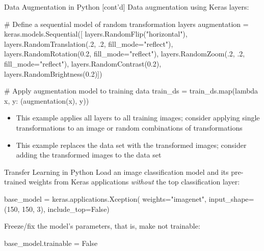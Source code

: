 \documentclass[ignorenonframetext,xcolor=x11names]{beamer}
\begin{document}
\begin{frame}[fragile]{Data Augmentation in Python \small [cont'd]}
Data augmentation using Keras layers:
\begin{pythoncode}
# Define a sequential model of random transformation layers
augmentation = keras.models.Sequential([
    layers.RandomFlip("horizontal"),
    layers.RandomTranslation(.2, .2, fill_mode="reflect"),
    layers.RandomRotation(0.2, fill_mode="reflect"),
    layers.RandomZoom(.2, .2, fill_mode="reflect"),
    layers.RandomContrast(0.2),
    layers.RandomBrightness(0.2)])

# Apply augmentation model to training data
train_ds = train_ds.map(lambda x, y: (augmentation(x), y))
\end{pythoncode}

\begin{block}{}
\small
\begin{itemize}
   \item This example applies all layers to all training images; consider applying single transformations to an image or random combinations of transformations
   \item This example replaces the data set with the transformed images; consider adding the transformed images to the data set
\end{itemize}
\end{block}
\end{frame}

\begin{frame}[fragile]{Transfer Learning in Python}
Load an image classification model and its  pre-trained  weights from Keras applications \emph{without} the top classification layer:
\begin{pythoncode}
base_model = keras.applications.Xception(
    weights="imagenet",
    input_shape=(150, 150, 3),
    include_top=False)
\end{pythoncode}

Freeze/fix the model's parameters, that is, make not trainable:
\begin{pythoncode}
base_model.trainable = False
\end{pythoncode}
\end{frame}
\end{document}
